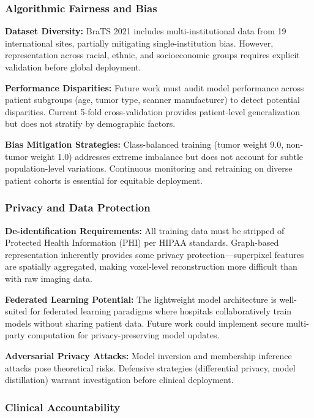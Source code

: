 \subsubsection{Algorithmic Fairness and Bias}

\textbf{Dataset Diversity:} BraTS 2021 includes multi-institutional data from 19 international sites, partially mitigating single-institution bias. However, representation across racial, ethnic, and socioeconomic groups requires explicit validation before global deployment.

\textbf{Performance Disparities:} Future work must audit model performance across patient subgroups (age, tumor type, scanner manufacturer) to detect potential disparities. Current 5-fold cross-validation provides patient-level generalization but does not stratify by demographic factors.

\textbf{Bias Mitigation Strategies:} Class-balanced training (tumor weight 9.0, non-tumor weight 1.0) addresses extreme imbalance but does not account for subtle population-level variations. Continuous monitoring and retraining on diverse patient cohorts is essential for equitable deployment.

\subsubsection{Privacy and Data Protection}

\textbf{De-identification Requirements:} All training data must be stripped of Protected Health Information (PHI) per HIPAA standards. Graph-based representation inherently provides some privacy protection—superpixel features are spatially aggregated, making voxel-level reconstruction more difficult than with raw imaging data.

\textbf{Federated Learning Potential:} The lightweight model architecture is well-suited for federated learning paradigms where hospitals collaboratively train models without sharing patient data. Future work could implement secure multi-party computation for privacy-preserving model updates.

\textbf{Adversarial Privacy Attacks:} Model inversion and membership inference attacks pose theoretical risks. Defensive strategies (differential privacy, model distillation) warrant investigation before clinical deployment.

\subsubsection{Clinical Accountability}

